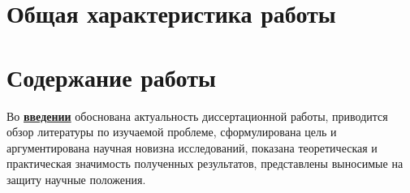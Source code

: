 \section*{Общая характеристика работы}

\newcommand{\actuality}{\pdfbookmark[1]{Актуальность}{actuality}\underline{\textbf{\actualityTXT}}}
\newcommand{\progress}{\pdfbookmark[1]{Разработанность темы}{progress}\underline{\textbf{\progressTXT}}}
\newcommand{\aim}{\pdfbookmark[1]{Цели}{aim}\underline{{\textbf\aimTXT}}}
\newcommand{\tasks}{\pdfbookmark[1]{Задачи}{tasks}\underline{\textbf{\tasksTXT}}}
\newcommand{\aimtasks}{\pdfbookmark[1]{Цели и задачи}{aimtasks}\aimtasksTXT}
\newcommand{\novelty}{\pdfbookmark[1]{Научная новизна}{novelty}\underline{\textbf{\noveltyTXT}}}
\newcommand{\influence}{\pdfbookmark[1]{Практическая значимость}{influence}\underline{\textbf{\influenceTXT}}}
\newcommand{\methods}{\pdfbookmark[1]{Методология и методы исследования}{methods}\underline{\textbf{\methodsTXT}}}
\newcommand{\defpositions}{\pdfbookmark[1]{Положения, выносимые на защиту}{defpositions}\underline{\textbf{\defpositionsTXT}}}
\newcommand{\reliability}{\pdfbookmark[1]{Достоверность}{reliability}\underline{\textbf{\reliabilityTXT}}}
\newcommand{\probation}{\pdfbookmark[1]{Апробация}{probation}\underline{\textbf{\probationTXT}}}
\newcommand{\contribution}{\pdfbookmark[1]{Личный вклад}{contribution}\underline{\textbf{\contributionTXT}}}
\newcommand{\publications}{\pdfbookmark[1]{Публикации}{publications}\underline{\textbf{\publicationsTXT}}}




\section*{Содержание работы}
Во \underline{\textbf{введении}} обоснована актуальность диссертационной работы,
приводится обзор литературы по изучаемой проблеме,
сформулирована цель и аргументирована научная новизна исследований, показана
теоретическая и практическая значимость полученных результатов,
представлены выносимые на защиту научные положения.


